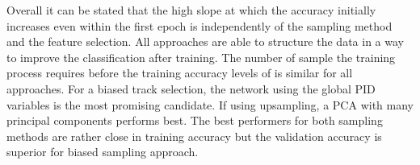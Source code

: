 Overall it can be stated that the high slope at which the accuracy initially increases even within the first epoch is independently of the sampling method and the feature selection. All approaches are able to structure the data in a way to improve the classification after training. The number of sample the training process requires before the training accuracy levels of is similar for all approaches. For a biased track selection, the network using the global PID variables is the most promising candidate. If using upsampling, a PCA with many principal components performs best. The best performers for both sampling methods are rather close in training accuracy but the validation accuracy is superior for biased sampling approach.

